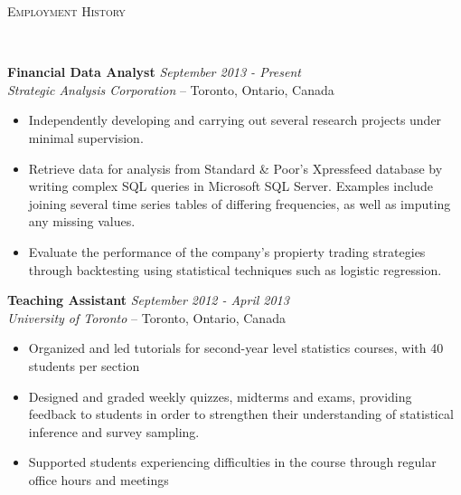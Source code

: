 \documentclass[9pt]{article}
\newenvironment{changemargin}[2]{%
  \begin{list}{}{%
    \setlength{\topsep}{0pt}%
    \setlength{\leftmargin}{#1}%
    \setlength{\rightmargin}{#2}%
    \setlength{\listparindent}{\parindent}%
    \setlength{\itemindent}{\parindent}%
    \setlength{\parsep}{\parskip}%
  }%
  \item[]}{\end{list}
}
\newcommand{\lineover}{
  \begin{changemargin}{-0.05in}{-0.05in}
    \vspace*{-8pt}
    \hrulefill \\
    \vspace*{-2pt}
  \end{changemargin}
}
\newcommand{\header}[1]{
  \begin{changemargin}{-0.5in}{-0.5in}
    {\large \scshape{#1}}\\
    \lineover
  \end{changemargin}
}
\newenvironment{body} {
  \vspace*{-16pt}
  \begin{changemargin}{-0.25in}{-0.5in}
  }
  {\end{changemargin}
}
\begin{document}
\smallskip

\header{Employment History}

\begin{body}
  \vspace{14pt}

  \textbf{Financial Data Analyst} \hfill \emph{September 2013 - Present}\\
  \emph{Strategic Analysis Corporation} -- Toronto, Ontario, Canada
  \vspace*{-4pt}
  \begin{itemize} \itemsep -0pt  %
    \item Independently developing and carrying out several research projects
      under minimal supervision.
    \item Retrieve data for analysis from Standard \& Poor's Xpressfeed
      database by writing complex SQL queries in Microsoft SQL Server. Examples
      include joining several time series tables of differing frequencies, as well as
      imputing any missing values.
    \item Evaluate the performance of the company's propierty trading
      strategies through backtesting using statistical techniques such as logistic
      regression.
  \end{itemize}

  \textbf{Teaching Assistant} \hfill \emph{September 2012 - April 2013}\\
  \emph{University of Toronto} -- Toronto, Ontario, Canada
  \vspace*{-4pt}
  \begin{itemize} \itemsep -0pt  %
    \item Organized and led tutorials for second-year level statistics courses,
      with 40 students per section
    \item Designed and graded weekly quizzes, midterms and exams, providing feedback
      to students in order to strengthen their understanding of statistical
      inference and survey sampling.
    \item Supported students experiencing difficulties in the course through
      regular office hours and meetings
  \end{itemize}



\end{body}
\end{document}
